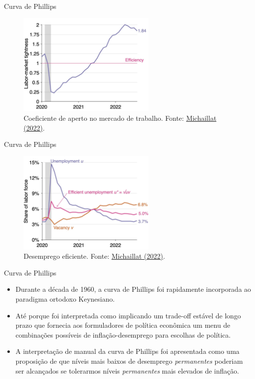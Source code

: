 \documentclass[10pt]{beamer}
\begin{document}
\begin{frame}{Curva de Phillips}
    \begin{figure}
        \centering
        \includegraphics[width=0.6\textwidth]{./figures/aula8_fig7.PNG}
        \caption{Coeficiente de aperto no mercado de trabalho. Fonte: \href{https://twitter.com/pmichaillat/status/1565709944057241600}{Michaillat (2022)}.}
        \label{fig:uv}
    \end{figure}
\end{frame}

\begin{frame}{Curva de Phillips}
    \begin{figure}
        \centering
        \includegraphics[width=0.6\textwidth]{./figures/aula8_fig8.PNG}
        \caption{Desemprego eficiente. Fonte: \href{https://twitter.com/pmichaillat/status/1565709944057241600}{Michaillat (2022)}.}
        \label{fig:uv}
    \end{figure}
\end{frame}

\begin{frame}{Curva de Phillips}
    \begin{itemize}
        \item Durante a década de 1960, a curva de Phillips foi rapidamente incorporada ao paradigma ortodoxo Keynesiano.
        \bigskip
        \item Até porque foi interpretada como implicando um trade-off estável de longo prazo que fornecia aos formuladores de política econômica um menu de combinações possíveis de inflação-desemprego para escolhas de política.
        \bigskip
        \item A interpretação de manual da curva de Phillips foi apresentada como uma proposição de que níveis mais baixos de desemprego \emph{permanentes} poderiam ser alcançados se tolerarmos níveis \emph{permanentes} mais elevados de inflação.
    \end{itemize}
\end{frame}
\end{document}
